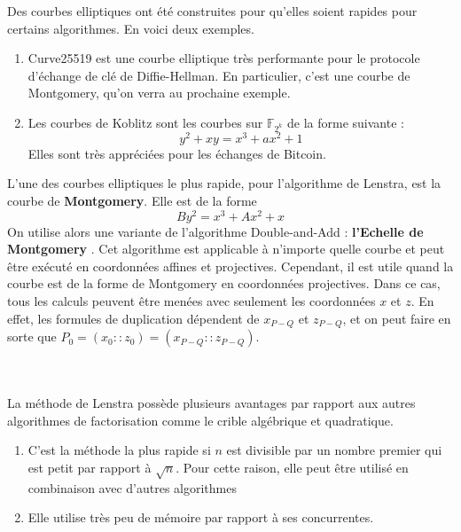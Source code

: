\documentclass[a4paper]{article}
\begin{document}
\begin{rem}
Des courbes elliptiques ont été construites pour qu'elles soient rapides pour certains algorithmes. 
En voici deux exemples.
\begin{enumerate}
\item  Curve25519 est une courbe elliptique très performante pour le protocole d'échange de clé de Diffie-Hellman. En particulier, c'est une courbe de Montgomery, qu'on verra au prochaine exemple.
\item Les courbes de Koblitz sont les courbes sur $\mathbb{F}_{2^k}$ de la forme suivante :
\begin{equation*}
y^2+xy=x^3+ax^2+1
\end{equation*}
Elles sont très appréciées pour les échanges de Bitcoin.
\end{enumerate}
\end{rem}

\noindent L'une des courbes elliptiques le plus rapide, pour l'algorithme de Lenstra, est la courbe de \textbf{Montgomery}. Elle est de la forme 
\begin{equation*}
By^2=x^3+Ax^2+x
\end{equation*}
On utilise alors une variante de l'algorithme Double-and-Add : \textbf{l'Echelle de Montgomery} \cite{ref17}. 
Cet algorithme est applicable à n'importe quelle courbe et peut être exécuté en coordonnées affines et projectives. Cependant, il est utile quand la courbe est de la forme de Montgomery en coordonnées projectives. Dans ce cas, tous les calculs peuvent être menées avec seulement les coordonnées $x$ et $z$. 
En effet, les formules de duplication dépendent de $x_{P-Q}$ et $z_{P-Q}$, et on peut faire en sorte que $P_{0}=(x_{0}::z_{0})=(x_{P-Q}::z_{P-Q})$. \\ \\
\\
\begin{rem} 
\normalfont
La méthode de Lenstra  possède plusieurs avantages par rapport aux autres algorithmes de factorisation comme le crible algébrique et quadratique.
\begin{enumerate}
\item C'est la méthode la plus rapide si $n$ est divisible par un nombre premier qui est petit par rapport à $\sqrt{n}$.
Pour cette raison, elle peut être utilisé en combinaison avec d'autres algorithmes
\item Elle utilise très peu de mémoire par rapport à ses concurrentes.
\end{enumerate}

\end{rem}
\end{document}
